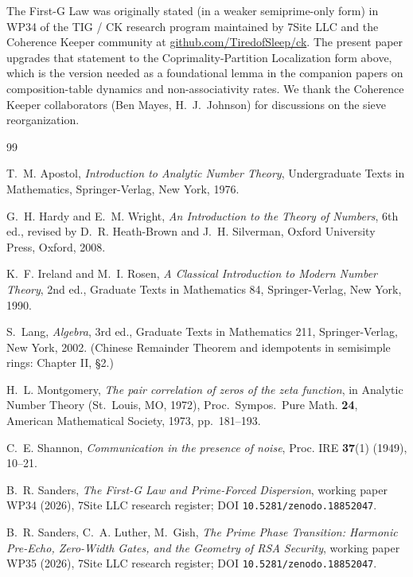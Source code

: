 \documentclass[11pt,reqno]{amsart}
\theoremstyle{definition}
\begin{document}
The First-G Law was originally stated (in a weaker semiprime-only form)
in WP34 \cite{WP34} of the TIG / CK research program maintained by 7Site
LLC and the Coherence Keeper community at
\href{https://github.com/TiredofSleep/ck}{github.com/TiredofSleep/ck}. The
present paper upgrades that statement to the Coprimality-Partition
Localization form above, which is the version needed as a foundational
lemma in the companion papers \cite{WP35,WP101} on composition-table
dynamics and non-associativity rates. We thank the Coherence Keeper
collaborators (Ben Mayes, H.~J.~Johnson) for discussions on the sieve
reorganization.

\begin{thebibliography}{99}

T.~M. Apostol, \emph{Introduction to Analytic Number Theory}, Undergraduate
Texts in Mathematics, Springer-Verlag, New York, 1976.

G.~H. Hardy and E.~M. Wright, \emph{An Introduction to the Theory of
Numbers}, 6th ed., revised by D.~R. Heath-Brown and J.~H. Silverman, Oxford
University Press, Oxford, 2008.

K.~F. Ireland and M.~I. Rosen, \emph{A Classical Introduction to Modern
Number Theory}, 2nd ed., Graduate Texts in Mathematics 84, Springer-Verlag,
New York, 1990.

S.~Lang, \emph{Algebra}, 3rd ed., Graduate Texts in Mathematics 211,
Springer-Verlag, New York, 2002. (Chinese Remainder Theorem and
idempotents in semisimple rings: Chapter II, \S 2.)

H.~L. Montgomery, \emph{The pair correlation of zeros of the zeta function},
in Analytic Number Theory (St.~Louis, MO, 1972), Proc.~Sympos.~Pure Math.
\textbf{24}, American Mathematical Society, 1973, pp.~181--193.

C.~E. Shannon, \emph{Communication in the presence of noise}, Proc. IRE
\textbf{37}(1) (1949), 10--21.

B.~R. Sanders, \emph{The First-G Law and Prime-Forced Dispersion}, working
paper WP34 (2026), 7Site LLC research register;
DOI \texttt{10.5281/zenodo.18852047}.

B.~R. Sanders, C.~A. Luther, M.~Gish, \emph{The Prime Phase Transition:
Harmonic Pre-Echo, Zero-Width Gates, and the Geometry of RSA Security},
working paper WP35 (2026), 7Site LLC research register;
DOI \texttt{10.5281/zenodo.18852047}.


\end{thebibliography}
\end{document}
